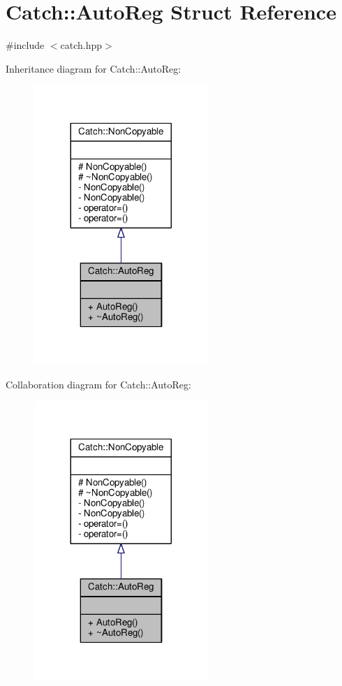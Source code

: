 \hypertarget{struct_catch_1_1_auto_reg}{\section{Catch\-:\-:Auto\-Reg Struct Reference}
\label{struct_catch_1_1_auto_reg}
}


{\ttfamily \#include $<$catch.\-hpp$>$}



Inheritance diagram for Catch\-:\-:Auto\-Reg\-:
\nopagebreak
\begin{figure}[H]
\begin{center}
\leavevmode
\includegraphics[width=188pt]{struct_catch_1_1_auto_reg__inherit__graph}
\end{center}
\end{figure}


Collaboration diagram for Catch\-:\-:Auto\-Reg\-:
\nopagebreak
\begin{figure}[H]
\begin{center}
\leavevmode
\includegraphics[width=188pt]{struct_catch_1_1_auto_reg__coll__graph}
\end{center}
\end{figure}
